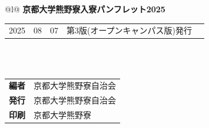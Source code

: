 
\vspace*{\fill} %


\begin{flushleft}
  \begin{tabular*}{\textwidth}{@{}l@{\extracolsep{\fill}}}
      \textbf{\huge 京都大学熊野寮入寮パンフレット2025} \\
      \hline
      \begin{tabular}{@{}r@{年\kern.5zw}r@{月\kern.5zw}r@{日\kern1.5zw}ll}
          2025 &  08 & 07 & 第3版(オープンキャンパス版)発行 & \\
      \end{tabular} \\
      \\
      \begin{tabular}{@{}l@{\kern.5zw\textbf{:}\kern1zw}l}
          \textbf{編者} & 京都大学熊野寮自治会 \\
          \textbf{発行} & 京都大学熊野寮自治会 \\
          \textbf{印刷} & 京都大学熊野寮 \\
      \end{tabular} \\
      \hline
  \end{tabular*}
\end{flushleft}